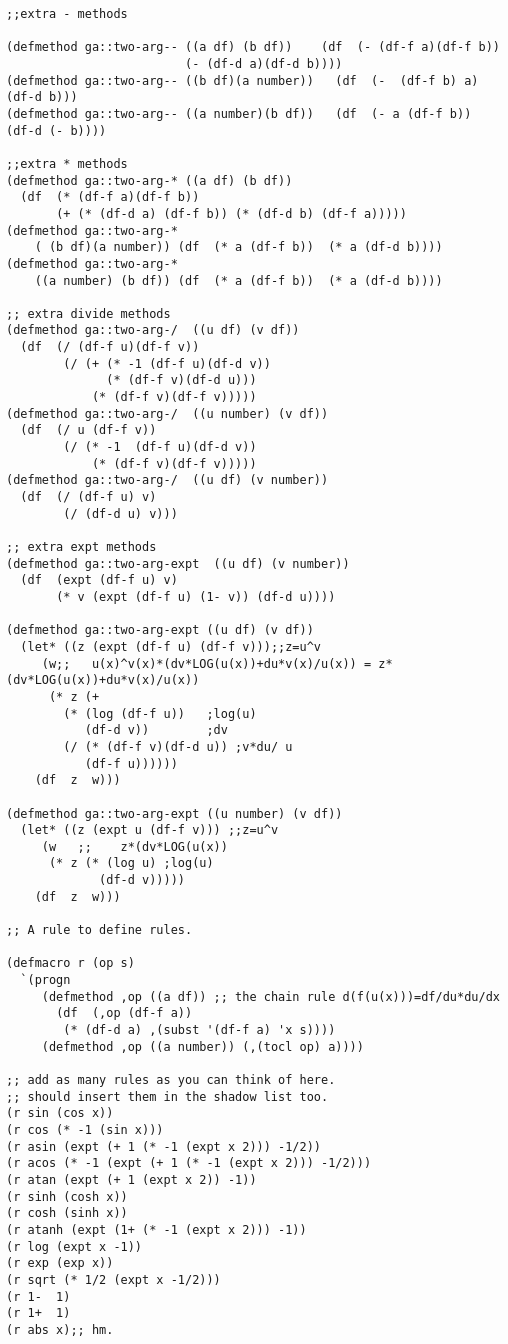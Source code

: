 \documentclass{article}
\begin{document}
{{{{\begin{verbatim}
;;extra - methods

(defmethod ga::two-arg-- ((a df) (b df))    (df  (- (df-f a)(df-f b))
						 (- (df-d a)(df-d b))))
(defmethod ga::two-arg-- ((b df)(a number))   (df  (-  (df-f b) a)    (df-d b)))
(defmethod ga::two-arg-- ((a number)(b df))   (df  (- a (df-f b))    (df-d (- b))))

;;extra * methods
(defmethod ga::two-arg-* ((a df) (b df)) 
  (df  (* (df-f a)(df-f b))
       (+ (* (df-d a) (df-f b)) (* (df-d b) (df-f a)))))
(defmethod ga::two-arg-* 
    ( (b df)(a number)) (df  (* a (df-f b))  (* a (df-d b))))
(defmethod ga::two-arg-* 
    ((a number) (b df)) (df  (* a (df-f b))  (* a (df-d b))))

;; extra divide methods
(defmethod ga::two-arg-/  ((u df) (v df)) 
  (df  (/ (df-f u)(df-f v))
	    (/ (+ (* -1 (df-f u)(df-d v))
			  (* (df-f v)(df-d u)))
		    (* (df-f v)(df-f v)))))
(defmethod ga::two-arg-/  ((u number) (v df)) 
  (df  (/ u (df-f v))
	    (/ (* -1  (df-f u)(df-d v))
		    (* (df-f v)(df-f v)))))
(defmethod ga::two-arg-/  ((u df) (v number)) 
  (df  (/ (df-f u) v)
	    (/ (df-d u) v)))

;; extra expt methods
(defmethod ga::two-arg-expt  ((u df) (v number))
  (df  (expt (df-f u) v)
       (* v (expt (df-f u) (1- v)) (df-d u))))

(defmethod ga::two-arg-expt ((u df) (v df))
  (let* ((z (expt (df-f u) (df-f v)));;z=u^v
	 (w;;   u(x)^v(x)*(dv*LOG(u(x))+du*v(x)/u(x)) = z*(dv*LOG(u(x))+du*v(x)/u(x))
	  (* z (+
		(* (log (df-f u))	;log(u)
		   (df-d v))		;dv
		(/ (* (df-f v)(df-d u)) ;v*du/ u
		   (df-f u))))))
    (df  z  w)))

(defmethod ga::two-arg-expt ((u number) (v df))
  (let* ((z (expt u (df-f v))) ;;z=u^v
	 (w   ;;    z*(dv*LOG(u(x))
	  (* z (* (log u) ;log(u)
			 (df-d v)))))
    (df  z  w)))

;; A rule to define rules.

(defmacro r (op s)
  `(progn
     (defmethod ,op ((a df)) ;; the chain rule d(f(u(x)))=df/du*du/dx
       (df  (,op (df-f a))
	    (* (df-d a) ,(subst '(df-f a) 'x s))))
     (defmethod ,op ((a number)) (,(tocl op) a))))

;; add as many rules as you can think of here.
;; should insert them in the shadow list too.
(r sin (cos x))
(r cos (* -1 (sin x)))
(r asin (expt (+ 1 (* -1 (expt x 2))) -1/2))
(r acos (* -1 (expt (+ 1 (* -1 (expt x 2))) -1/2)))
(r atan (expt (+ 1 (expt x 2)) -1))
(r sinh (cosh x))
(r cosh (sinh x))
(r atanh (expt (1+ (* -1 (expt x 2))) -1))
(r log (expt x -1))
(r exp (exp x))
(r sqrt (* 1/2 (expt x -1/2)))
(r 1-  1)
(r 1+  1)
(r abs x);; hm.


\end{verbatim}}}}}
\end{document}
